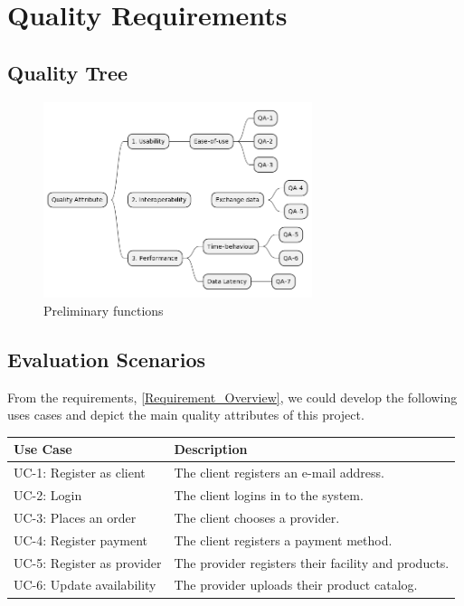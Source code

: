 \section{Quality Requirements}

\subsection{Quality Tree}

\begin{figure}[H]
    \centering
    \includegraphics[width=0.7\textwidth]{assets/quality_tree.png}
    \caption{Preliminary functions}
    \label{fig:quality_tree}
\end{figure}


\subsection{Evaluation Scenarios} 
From the requirements, \ref{Requirement_Overview}, we could develop the following uses cases and depict the main quality 
attributes of this project. 

\begin{table}[H]
    \begin{tabularx}{\textwidth}{lX}
    \toprule
    Use Case & Description  \\
    \midrule
    UC-1: Register as \gls{client} & The \gls{client} registers an e-mail address.\\
    UC-2: Login & The \gls{client} logins in to the system. \\
    UC-3: Places an order & The \gls{client} chooses a \gls{provider}. \\
    UC-4: Register payment & The \gls{client} registers a payment method. \\
    UC-5: Register as \gls{provider} & The \gls{provider} registers their facility and products. \\
    UC-6: Update availability & The \gls{provider} uploads their product catalog. \\
    \bottomrule
    \end{tabularx}
\end{table}

